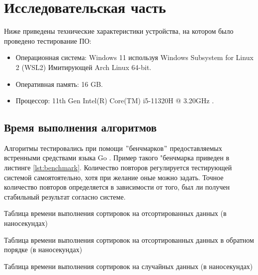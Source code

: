 \chapter{Исследовательская часть}
Ниже приведены технические характеристики устройства, на котором было проведено тестирование ПО:

\begin{itemize}
    \item Операционная система: Windows 11 используя Windows Subsystem for Linux 2 (WSL2) \cite{wsl2} Имитирующей Arch Linux \cite{arch} 64-bit.
    \item Оперативная память: 16 GB.
    \item Процессор: 11th Gen Intel(R) Core(TM) i5-11320H @ 3.20GHz \cite{i5}.
\end{itemize}

\section{Время выполнения алгоритмов}
Алгоритмы тестировались при помощи \("\)бенчмарков\("\) предоставляемых встренными средствами языка Go \cite{go}.
Пример такого "бенчмарка приведен в листинге \ref{lst:benchmark}.
Количество повторов регулируется тестирующей системой самоятоятельно, хотя при желание оные можно задать.
Точное количество повторов определяется в зависимости от того, был ли получен стабильный результат согласно системе.



Таблица времени выполнения сортировок на отсортированных данных (в наносекундах)\newline
%

Таблица времени выполнения сортировок на отсортированных данных в обратном порядке (в наносекундах)\newline
%

Таблица времени выполнения сортировок на случайных данных (в наносекундах)\newline


